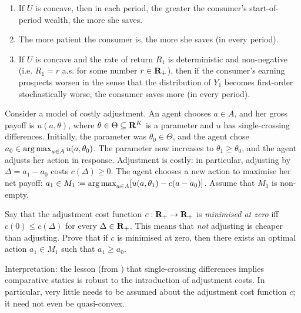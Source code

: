 \begin{exercise}
\begin{enumerate}[label=(\alph*)]
		\item If $U$ is concave, then in each period, the greater the consumer's start-of-period wealth, the more she saves.

		\item The more patient the consumer is, the more she saves (in every period).

		\item If $U$ is concave and the rate of return $R_1$ is deterministic and non-negative (i.e. $R_1=r$ a.s. for some number $r \in \mathbf{R}_+$), then if the consumer's earning prospects worsen in the sense that the distribution of $Y_1$ becomes first-order stochastically worse, the consumer saves more (in every period).
	
	\end{enumerate}
\end{exercise}

\begin{exercise}[based on \textcite{DekelQuahSinander}]
	\label{exercise:adj}
	Consider a model of costly adjustment. An agent chooses $a \in A$, and her gross payoff is $u(a,\theta)$, where $\theta \in \Theta \subseteq \mathbf{R}^K$ is a parameter and $u$ has single-crossing differences. Initially, the parameter was $\theta_0 \in \Theta$, and the agent chose $a_0 \in \operatorname*{arg\,max}_{a \in A} u(a,\theta_0)$. The parameter now increases to $\theta_1 \geq \theta_0$, and the agent adjusts her action in response. Adjustment is costly: in particular, adjusting by $\Delta = a_1 - a_0$ costs $c(\Delta) \geq 0$.  The agent chooses a new action to maximise her net payoff: $a_1 \in M_1 \coloneqq \operatorname*{arg\,max}_{a \in A} [u(a,\theta_1)-c(a-a_0)]$. Assume that $M_1$ is non-empty.

	Say that the adjustment cost function $c : \mathbf{R}_+ \to \mathbf{R}_+$ is \emph{minimised at zero} iff $c(0) \leq c(\Delta)$ for every $\Delta \in \mathbf{R}_+$. This means that \emph{not} adjusting is cheaper than adjusting. Prove that if $c$ is minimised at zero, then there exists an optimal action $a_1 \in M_1$ such that $a_1 \geq a_0$.

	Interpretation: the lesson (from ) that single-crossing differences implies comparative statics is robust to the introduction of adjustment costs. In particular, very little needs to be assumed about the adjustment cost function $c$; it need not even be quasi-convex.
\end{exercise}

